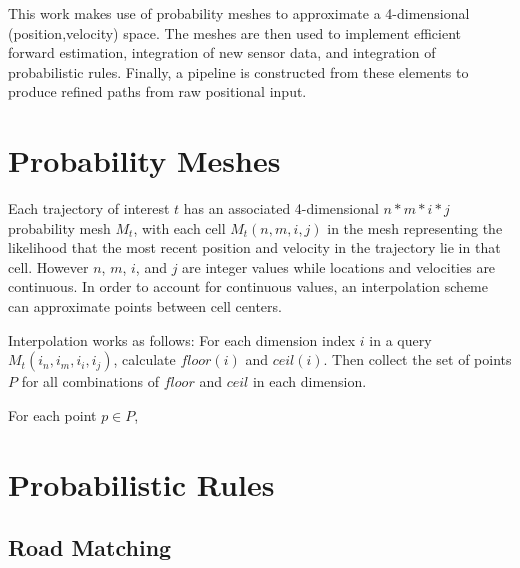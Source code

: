 This work makes use of probability meshes to approximate a 4-dimensional (position,velocity) space. The meshes are then used to implement efficient forward estimation, integration of new sensor data, and integration of probabilistic rules. Finally, a pipeline is constructed from these elements to produce refined paths from raw positional input.

\section{Probability Meshes}

Each trajectory of interest $t$ has an associated 4-dimensional $n*m*i*j$ probability mesh $M_t$, with each cell $M_t(n,m,i,j)$ in the mesh representing the likelihood that the most recent position and velocity in the trajectory lie in that cell.
However $n$, $m$, $i$, and $j$ are integer values while locations and velocities are continuous.
In order to account for continuous values, an interpolation scheme can approximate points between cell centers.

Interpolation works as follows: For each dimension index $i$ in a query $M_t(i_n, i_m, i_i, i_j)$, calculate $\mathit{floor}(i)$ and $\mathit{ceil}(i)$. Then collect the set of points $P$ for all combinations of $floor$ and $ceil$ in each dimension.

For each point $p \in P$,



\section{Probabilistic Rules}


\subsection{Road Matching}

